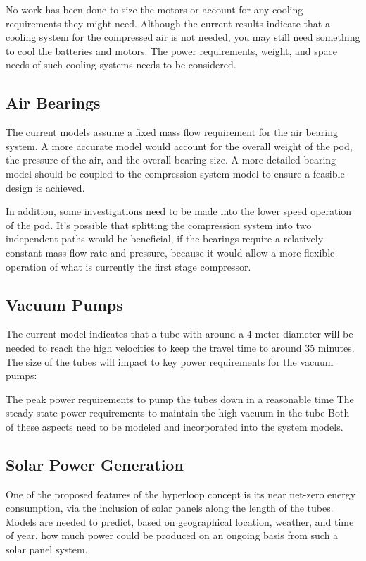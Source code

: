 \documentclass[heading.tex]{subfiles}
\begin{document}
No work has been done to size the motors or account for any cooling requirements they might need. Although the current results indicate that a cooling system for the compressed air is not needed, you may still need something to cool the batteries and motors. The power requirements, weight, and space needs of such cooling systems needs to be considered.

\subsection{Air Bearings}
The current models assume a fixed mass flow requirement for the air bearing system. A more accurate model would account for the overall weight of the pod, the pressure of the air, and the overall bearing size. A more detailed bearing model should be coupled to the compression system model to ensure a feasible design is achieved.

In addition, some investigations need to be made into the lower speed operation of the pod. It's possible that splitting the compression system into two independent paths would be beneficial, if the bearings require a relatively constant mass flow rate and pressure, because it would allow a more flexible operation of what is currently the first stage compressor.



\subsection{Vacuum Pumps}
The current model indicates that a tube with around a 4 meter diameter will be needed to reach the high velocities to keep the travel time to around 35 minutes. The size of the tubes will impact to key power requirements for the vacuum pumps:

The peak power requirements to pump the tubes down in a reasonable time
The steady state power requirements to maintain the high vacuum in the tube
Both of these aspects need to be modeled and incorporated into the system models.


\subsection{Solar Power Generation}
One of the proposed features of the hyperloop concept is its near net-zero energy consumption, via the inclusion of solar panels along the length of the tubes. Models are needed to predict, based on geographical location, weather, and time of year, how much power could be produced on an ongoing basis from such a solar panel system.
\end{document}
